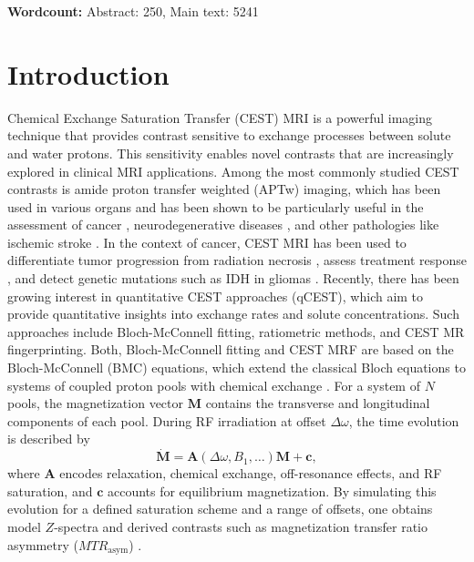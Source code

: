 \documentclass[11pt,a4paper]{article}
\begin{document}

\noindent\textbf{Wordcount:} Abstract: 250, Main text: 5241


\section{Introduction}\label{introduction}

Chemical Exchange Saturation Transfer (CEST) MRI is a powerful imaging technique that provides contrast sensitive to exchange processes between solute and water protons. This sensitivity enables novel contrasts that are increasingly explored in clinical MRI applications. Among the most commonly studied CEST contrasts is amide proton transfer weighted (APTw) imaging, which has been used in various organs and has been shown to be particularly useful in the assessment of cancer \cite{Zhou2022Consens}, neurodegenerative diseases \cite{ChenLin2019}, and other pathologies like ischemic stroke \cite{Tietze2014}. In the context of cancer, CEST MRI has been used to differentiate tumor progression from radiation necrosis \cite{Zeyen2025}, assess treatment response \cite{Kroh2023}, and detect genetic mutations such as IDH in gliomas \cite{Paech2018}. Recently, there has been growing interest in quantitative CEST approaches (qCEST), which aim to provide quantitative insights into exchange rates and solute concentrations. Such approaches include Bloch-McConnell fitting, ratiometric methods, and CEST MR fingerprinting.
Both, Bloch-McConnell fitting and CEST MRF are based on the Bloch-McConnell (BMC) equations, which extend the classical Bloch equations to systems of coupled proton pools with chemical exchange \cite{McConnell1958}. For a system of $N$ pools, the magnetization vector $\mathbf{M}$ contains the transverse and longitudinal components of each pool. During RF irradiation at offset $\Delta\omega$, the time evolution is described by 
\begin{equation}
\dot{\mathbf{M}} = \mathbf{A}(\Delta\omega, B_1, \ldots)\mathbf{M} + \mathbf{c},
\label{eq:bm}
\end{equation}
where $\mathbf{A}$ encodes relaxation, chemical exchange, off-resonance effects, and RF saturation, and $\mathbf{c}$ accounts for equilibrium magnetization. By simulating this evolution for a defined saturation scheme and a range of offsets, one obtains model $Z$-spectra and derived contrasts such as magnetization transfer ratio asymmetry ($MTR_{\mathrm{asym}}$) \cite{Zhou2003}. 
\end{document}
